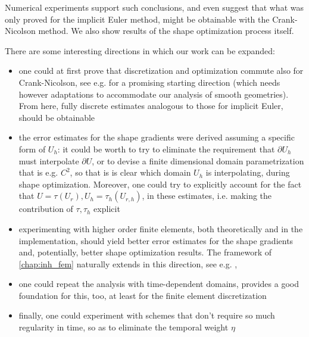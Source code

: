\documentclass[english,a4paper,10pt,oneside]{scrbook}	%
\theoremstyle{break}
\theoremstyle{remark}
\begin{document}
Numerical experiments support such conclusions, and even suggest that what was only proved for the implicit Euler method, might be obtainable with the Crank-Nicolson method. We also show results of the shape optimization process itself.

There are some interesting directions in which our work can be expanded:

\begin{itemize}
	\item one could at first prove that discretization and optimization commute also for Crank-Nicolson, see e.g. \cite{flaig} for a promising starting direction (which needs however adaptations to accommodate our analysis of smooth geometries). From here, fully discrete estimates analogous to those for implicit Euler, should be obtainable
	\item the error estimates for the shape gradients were derived assuming a specific form of $U_h$: it could be worth to try to eliminate the requirement that $\partial U_h$ must interpolate $\partial U$, or to devise a finite dimensional domain parametrization that is e.g. $C^2$, so that is is clear which domain $U_h$ is interpolating, during shape optimization. Moreover, one could try to explicitly account for the fact that $U=\tau (U_r), U_h = \tau_h(U_{r,h})$, in these estimates, i.e. making the contribution of $\tau, \tau_h$ explicit
	\item experimenting with higher order finite elements, both theoretically and in the implementation, should yield better error estimates for the shape gradients and, potentially, better shape optimization results. The framework of \cref{chap:inh_fem} naturally extends in this direction, see e.g. \cite{ranner}, \cite{elliott}
	\item one could repeat the analysis with time-dependent domains, \cite{ranner} provides a good foundation for this, too, at least for the finite element discretization
	\item finally, one could experiment with schemes that don't require so much regularity in time, so as to eliminate the temporal weight $\eta$
\end{itemize}
\end{document}
